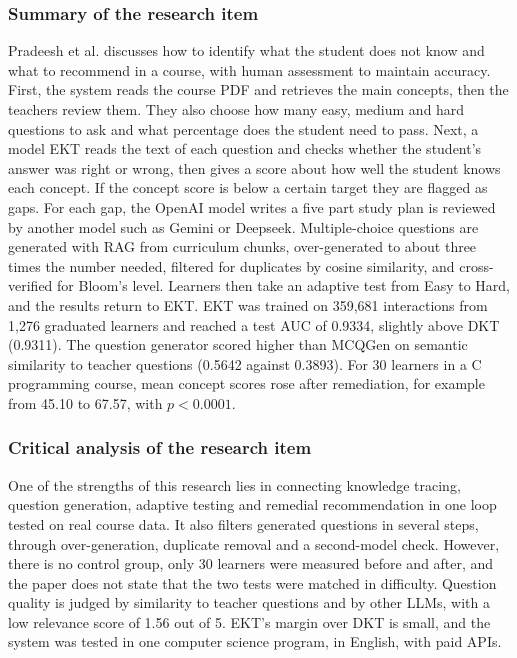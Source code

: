 \documentclass{FastFyp}
\begin{document}
\subsubsection{Summary of the research item}
Pradeesh et al. \cite{pradeesh2025aidriven} discusses how to identify what the student does not know and what to recommend in a course, with human assessment to maintain accuracy. First, the system reads the course PDF and retrieves the main concepts, then the teachers review them. They also choose how many easy, medium and hard questions to ask and what percentage does the student need to pass. Next, a model EKT reads the text of each question and checks whether the student's answer was right or wrong, then gives a score about how well the student knows each concept. If the concept score is below a certain target they are flagged as gaps. For each gap, the OpenAI model writes a five part study plan is reviewed by another model such as Gemini or Deepseek. Multiple-choice questions are generated with RAG from curriculum chunks, over-generated to about three times the number needed, filtered for duplicates by cosine similarity, and cross-verified for Bloom's level. Learners then take an adaptive test from Easy to Hard, and the results return to EKT. EKT was trained on 359,681 interactions from 1,276 graduated learners and reached a test AUC of 0.9334, slightly above DKT (0.9311). The question generator scored higher than MCQGen on semantic similarity to teacher questions (0.5642 against 0.3893). For 30 learners in a C programming course, mean concept scores rose after remediation, for example from 45.10 to 67.57, with $p < 0.0001$.


\subsubsection{Critical analysis of the research item}
One of the strengths of this research lies in connecting knowledge tracing, question generation, adaptive testing and remedial recommendation in one loop tested on real course data. It also filters generated questions in several steps, through over-generation, duplicate removal and a second-model check. However, there is no control group, only 30 learners were measured before and after, and the paper does not state that the two tests were matched in difficulty. Question quality is judged by similarity to teacher questions and by other LLMs, with a low relevance score of 1.56 out of 5. EKT's margin over DKT is small, and the system was tested in one computer science program, in English, with paid APIs.
\end{document}
